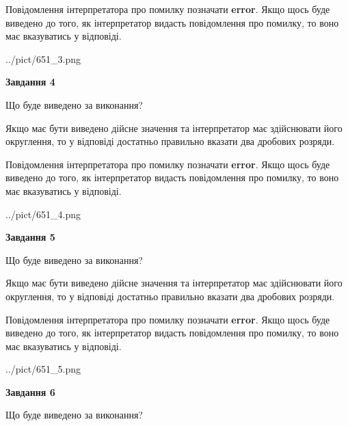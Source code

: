 \documentclass[12pt, ukrainian]{article}
\begin{document}
{\begin {Large}
Повідомлення інтерпретатора про помилку позначати \textbf{error}.
Якщо щось буде виведено до того, як інтерпретатор видасть повідомлення про помилку, 
то воно має вказуватись у відповіді. \par

\begin{center}
	{../pict/651_3.png}
\end{center}
\newpage

{\begin {center}\textbf{Завдання 4}\end {center}}\par
Що буде виведено за виконання? \par

Якщо має бути виведено дійсне значення та інтерпретатор має здійснювати його округлення, 
то у відповіді достатньо правильно вказати два дробових розряди.

Повідомлення інтерпретатора про помилку позначати \textbf{error}.
Якщо щось буде виведено до того, як інтерпретатор видасть повідомлення про помилку, 
то воно має вказуватись у відповіді. \par

\begin{center}
	{../pict/651_4.png}
\end{center}
\newpage

{\begin {center}\textbf{Завдання 5}\end {center}}\par
Що буде виведено за виконання? \par

Якщо має бути виведено дійсне значення та інтерпретатор має здійснювати його округлення, 
то у відповіді достатньо правильно вказати два дробових розряди.

Повідомлення інтерпретатора про помилку позначати \textbf{error}.
Якщо щось буде виведено до того, як інтерпретатор видасть повідомлення про помилку, 
то воно має вказуватись у відповіді. \par

\begin{center}
	{../pict/651_5.png}
\end{center}
\newpage

{\begin {center}\textbf{Завдання 6}\end {center}}\par
Що буде виведено за виконання? \par


\end{Large}}
\end{document}

